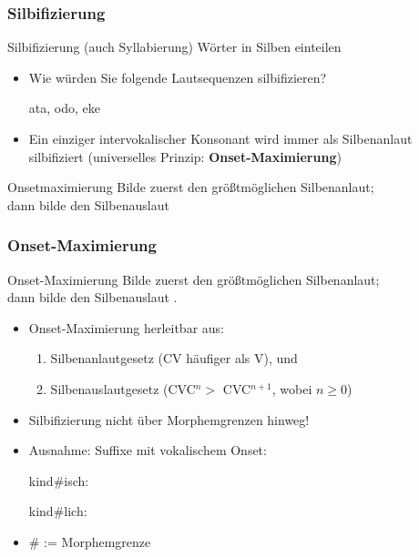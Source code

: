 \begin{frame}
\frametitle{Silbifizierung}

\begin{block}{Silbifizierung (auch Syllabierung)}
	Wörter in Silben einteilen
\end{block}

\begin{itemize}
	\item Wie würden Sie folgende Lautsequenzen silbifizieren?
	
	\ea ata, odo, eke
	\z
	
	\pause
	
	\item Ein einziger intervokalischer Konsonant wird immer als Silbenanlaut silbifiziert (universelles Prinzip: \textbf{Onset-Maximierung})


\end{itemize}

\begin{block}{Onsetmaximierung}
Bilde zuerst den größtmöglichen Silbenanlaut;\\
dann bilde den Silbenauslaut \citep[218]{Hall00a}
\end{block}

\end{frame}


\begin{frame}
\frametitle{Onset-Maximierung}

\begin{block}{Onset-Maximierung}
Bilde zuerst den größtmöglichen Silbenanlaut;\\
dann bilde den Silbenauslaut \citep[218]{Hall00a}.
\end{block}


\begin{itemize}
\item Onset-Maximierung herleitbar aus:
\begin{enumerate}
\item Silbenanlautgesetz (CV häufiger als V), und
\item Silbenauslautgesetz (CVC$^{n} >$ CVC$^{n+1}$, wobei $n \geq 0$)
\end{enumerate}

\pause
\item Silbifizierung nicht über Morphemgrenzen hinweg! 
\item Ausnahme: Suffixe mit vokalischem Onset:

\ea
kind\#isch: 
\z

\ea
kind\#lich: \textipa{[kInt.lI\c{c}]}
\z

\item \# := Morphemgrenze



\end{itemize}

\end{frame}

